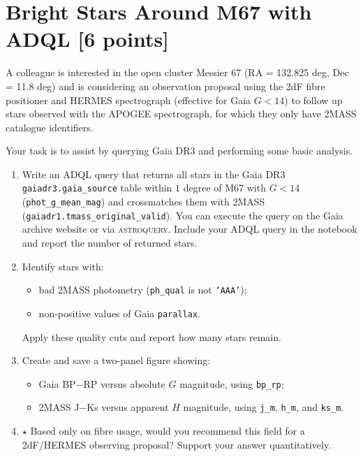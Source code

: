 \documentclass[a4paper,12pt]{article}
\begin{document}
\section{Bright Stars Around M67 with ADQL \hfill [6 points]}

A colleague is interested in the open cluster Messier 67 (RA = 132.825 deg, Dec = 11.8 deg) and is considering an observation proposal using the 2dF fibre positioner and HERMES spectrograph (effective for Gaia $G<14$) to follow up stars observed with the APOGEE spectrograph, for which they only have 2MASS catalogue identifiers.

Your task is to assist by querying Gaia DR3 and performing some basic analysis.

\begin{enumerate}[leftmargin=0.7cm]

    \item Write an ADQL query that returns all stars in the Gaia DR3 \texttt{gaiadr3.gaia\_source} table within $1$ degree of M67 with $G<14$ (\texttt{phot\_g\_mean\_mag}) and crossmatches them with 2MASS (\texttt{gaiadr1.tmass\_original\_valid}). You can execute the query on the Gaia archive website or via \textsc{astroquery}. Include your ADQL query in the notebook and report the number of returned stars.

    \item Identify stars with:
    \begin{itemize}
        \item bad 2MASS photometry (\texttt{ph\_qual} is not \texttt{'AAA'});
        \item non-positive values of Gaia \texttt{parallax}.
    \end{itemize}
    Apply these quality cuts and report how many stars remain.

    \item Create and save a two-panel figure showing:
    \begin{itemize}
        \item Gaia BP$-$RP versus absolute $G$ magnitude, using \texttt{bp\_rp};
        \item 2MASS J$-$Ks versus apparent $H$ magnitude, using
        \texttt{j\_m}, \texttt{h\_m}, and \texttt{ks\_m}.
    \end{itemize}

    \item $\star$ Based only on fibre usage, would you recommend this field for a 2dF/HERMES observing proposal? Support your answer quantitatively.

\end{enumerate}
\end{document}
